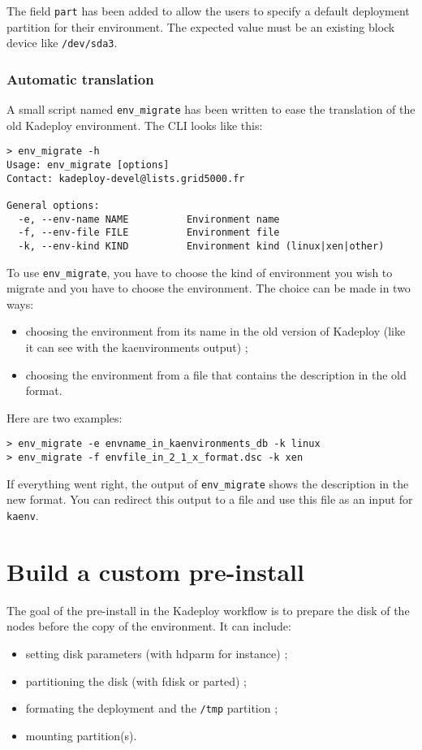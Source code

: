 \documentclass[a4wide,10pt,oneside]{book}
\begin{document}
The field \texttt{part} has been added to allow the users to specify a default deployment partition for their environment. The expected value must be an existing block device like \texttt{/dev/sda3}.

\subsubsection{Automatic translation}
A small script named \texttt{env\_migrate} has been written to ease the translation of the old Kadeploy environment. The CLI looks like this:

\begin{small}
\begin{verbatim}
> env_migrate -h
Usage: env_migrate [options]
Contact: kadeploy-devel@lists.grid5000.fr

General options:
  -e, --env-name NAME          Environment name
  -f, --env-file FILE          Environment file
  -k, --env-kind KIND          Environment kind (linux|xen|other)
\end{verbatim}
\end{small}

To use \texttt{env\_migrate}, you have to choose the kind of environment you wish to migrate and you have to choose the environment. The choice can be made in two ways:
\begin{itemize}
\item choosing the environment from its name in the old version of Kadeploy (like it can see with the kaenvironments output) ;
\item choosing the environment from a file that contains the description in the old format.
\end{itemize}

Here are two examples:
\begin{small}
\begin{verbatim}
> env_migrate -e envname_in_kaenvironments_db -k linux
> env_migrate -f envfile_in_2_1_x_format.dsc -k xen
\end{verbatim}
\end{small}

If everything went right, the output of \texttt{env\_migrate} shows the description in the new format. You can redirect this output to a file and use this file as an input for \texttt{kaenv}.

\section{Build a custom pre-install}\label{sec:custom-preinstall}
The goal of the pre-install in the Kadeploy workflow is to prepare the disk of the nodes before the copy of the environment. It can include:
\begin{itemize}
\item setting disk parameters (with hdparm for instance) ;
\item partitioning the disk (with fdisk or parted) ;
\item formating the deployment and the \texttt{/tmp} partition ;
\item mounting partition(s).
\end{itemize}
\end{document}
